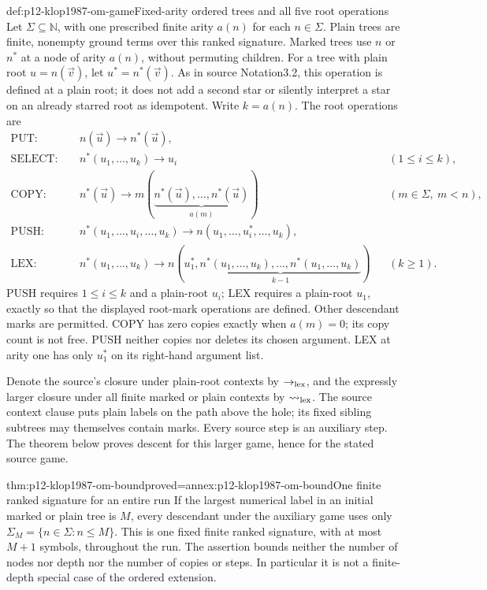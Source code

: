 \begin{hbdefinition}{def:p12-klop1987-om-game}{Fixed-arity ordered trees and all five root operations}
Let \(\Sigma\subseteq\mathbb N\), with one prescribed finite arity
\(a(n)\) for each \(n\in\Sigma\). Plain trees are finite, nonempty
ground terms over this ranked signature. Marked trees use \(n\) or
\(n^*\) at a node of arity \(a(n)\), without permuting children.
For a tree with plain root \(u=n(\vec v)\), let
\(u^*=n^*(\vec v)\). As in source Notation3.2, this operation is
defined at a plain root; it does not add a second star or silently
interpret a star on an already starred root as idempotent.
Write \(k=a(n)\). The root operations are
\begin{align*}
 \mathrm{PUT}:\quad &n(\vec u)\longrightarrow n^*(\vec u),\\
 \mathrm{SELECT}:\quad &n^*(u_1,\ldots,u_k)\longrightarrow u_i
       &&(1\leq i\leq k),\\
 \mathrm{COPY}:\quad &n^*(\vec u)\longrightarrow
       m(\underbrace{n^*(\vec u),\ldots,n^*(\vec u)}_{a(m)})
       &&(m\in\Sigma,\ m<n),\\
 \mathrm{PUSH}:\quad &n^*(u_1,\ldots,u_i,\ldots,u_k)
       \longrightarrow n(u_1,\ldots,u_i^*,\ldots,u_k),\\
 \mathrm{LEX}:\quad &n^*(u_1,\ldots,u_k)\longrightarrow
       n(u_1^*,\underbrace{n^*(u_1,\ldots,u_k),\ldots,
                      n^*(u_1,\ldots,u_k)}_{k-1})
       &&(k\geq1).
\end{align*}
PUSH requires \(1\leq i\leq k\) and a plain-root \(u_i\);
LEX requires a plain-root \(u_1\), exactly so that the displayed
root-mark operations are defined. Other descendant marks are permitted.
COPY has zero copies exactly when \(a(m)=0\); its copy count is not
free. PUSH neither copies nor deletes its chosen argument. LEX at
arity one has only \(u_1^*\) on its right-hand argument list.

Denote the source's closure under plain-root contexts by
\(\to_{\rm lex}\), and the expressly larger closure under all
finite marked or plain contexts by \(\rightsquigarrow_{\rm lex}\).
The source context clause puts plain labels on the path above the
hole; its fixed sibling subtrees may themselves contain marks.
Every source step is an auxiliary step. The theorem below proves
descent for this larger game, hence for the stated source game.
\end{hbdefinition}

\begin{hblemma}{thm:p12-klop1987-om-bound}{proved=annex:p12-klop1987-om-bound}{One finite ranked signature for an entire run}
If the largest numerical label in an initial marked or plain tree is
\(M\), every descendant under the auxiliary game uses only
\(\Sigma_M=\{n\in\Sigma:n\leq M\}\). This is one fixed finite
ranked signature, with at most \(M+1\) symbols, throughout the run.
The assertion bounds neither the number of nodes nor depth nor the
number of copies or steps. In particular it is not a finite-depth
special case of the ordered extension.
\end{hblemma}

